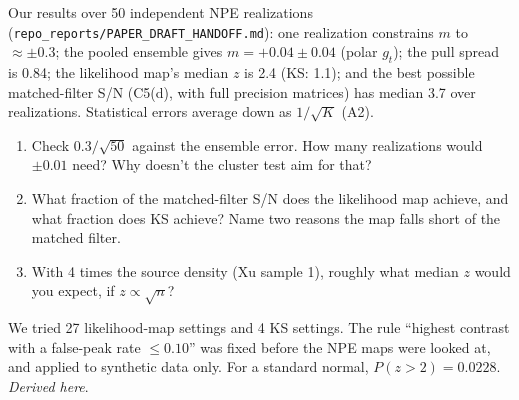 
\begin{given}
Our results over 50 independent NPE realizations (\texttt{repo\_reports/PAPER\_DRAFT\_HANDOFF.md}): one realization
constrains $m$ to $\approx\pm0.3$; the pooled ensemble gives $m = +0.04 \pm 0.04$ (polar $g_t$); the pull spread is 0.84;
the likelihood map's median $z$ is 2.4 (KS: 1.1); and the best possible matched-filter S/N (C5(d), with full precision
matrices) has median 3.7 over realizations. Statistical errors average down as $1/\sqrt K$ (A2).
\end{given}


\begin{enumerate}
  \item Check $0.3/\sqrt{50}$ against the ensemble error. How many realizations would $\pm0.01$ need? Why doesn't the
    cluster test aim for that?
  \item What fraction of the matched-filter S/N does the likelihood map achieve, and what fraction does KS achieve?
    Name two reasons the map falls short of the matched filter.
  \item With 4 times the source density (Xu sample 1), roughly what median $z$ would you expect, if $z \propto \sqrt{n}$?
\end{enumerate}



\begin{given}
We tried 27 likelihood-map settings and 4 KS settings. The rule ``highest contrast with a false-peak rate $\le 0.10$''
was fixed before the NPE maps were looked at, and applied to synthetic data only. For a standard normal, $P(z > 2) =
0.0228$. \emph{Derived here}.
\end{given}

